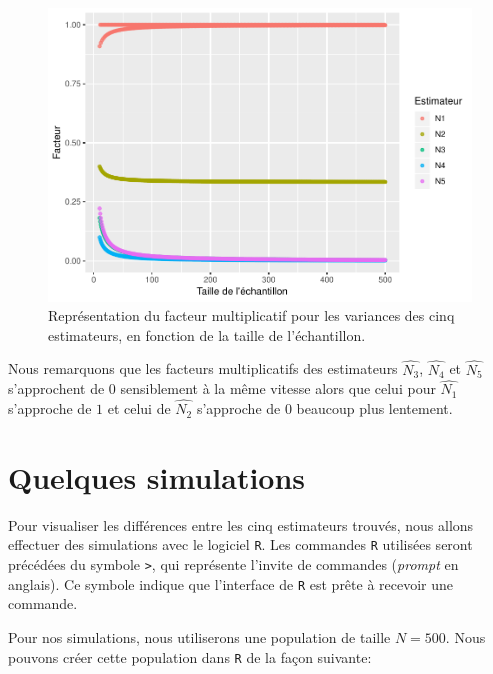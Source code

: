 \documentclass[10pt]{article}
\begin{document}
\begin{figure}[!htb]

{\centering \includegraphics[width=0.9\linewidth]{serial_number_amq_files/figure-latex/fig-facteur-1} 

}

\caption{Représentation du facteur multiplicatif pour les variances des cinq estimateurs, en fonction de la taille de l'échantillon.}\label{fig:fig-facteur}
\end{figure}

Nous remarquons que les facteurs multiplicatifs des estimateurs
\(\widehat{N_3}\), \(\widehat{N_4}\) et \(\widehat{N_5}\) s'approchent
de \(0\) sensiblement à la même vitesse alors que celui pour
\(\widehat{N_1}\) s'approche de \(1\) et celui de \(\widehat{N_2}\)
s'approche de \(0\) beaucoup plus lentement.

\hypertarget{quelques-simulations}{%
\section{\texorpdfstring{Quelques simulations
\label{simul}}{Quelques simulations }}\label{quelques-simulations}}

Pour visualiser les différences entre les cinq estimateurs trouvés, nous
allons effectuer des simulations avec le logiciel \texttt{R}. Les
commandes \texttt{R} utilisées seront précédées du symbole
\texttt{\textgreater{}}, qui représente l'invite de commandes
(\emph{prompt} en anglais). Ce symbole indique que l'interface de
\texttt{R} est prête à recevoir une commande.

Pour nos simulations, nous utiliserons une population de taille
\(N=500\). Nous pouvons créer cette population dans \texttt{R} de la
façon suivante:
\end{document}
